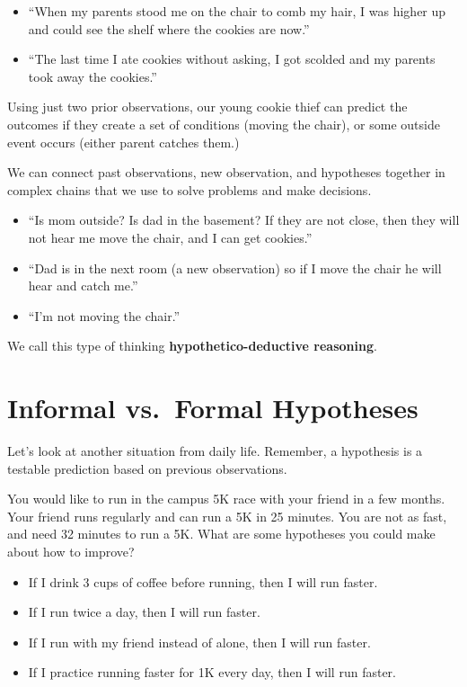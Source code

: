\documentclass[
]{book}
\providecommand{\tightlist}{%
  \setlength{\itemsep}{0pt}\setlength{\parskip}{0pt}}
\begin{document}
\begin{itemize}
\tightlist
\item
  ``When my parents stood me on the chair to comb my hair, I was higher up and could see the shelf where the cookies are now.''
\item
  ``The last time I ate cookies without asking, I got scolded and my parents took away the cookies.''
\end{itemize}

Using just two prior observations, our young cookie thief can predict the outcomes if they create a set of conditions (moving the chair), or some outside event occurs (either parent catches them.)

We can connect past observations, new observation, and hypotheses together in complex chains that we use to solve problems and make decisions.

\begin{itemize}
\tightlist
\item
  ``Is mom outside? Is dad in the basement? If they are not close, then they will not hear me move the chair, and I can get cookies.''
\item
  ``Dad is in the next room (a new observation) so if I move the chair he will hear and catch me.''
\item
  ``I'm not moving the chair.''
\end{itemize}

We call this type of thinking \textbf{hypothetico-deductive reasoning}.

\hypertarget{informal-vs.-formal-hypotheses}{%
\section{Informal vs.~Formal Hypotheses}\label{informal-vs.-formal-hypotheses}}

Let's look at another situation from daily life. Remember, a hypothesis is a testable prediction based on previous observations.

You would like to run in the campus 5K race with your friend in a few months. Your friend runs regularly and can run a 5K in 25 minutes. You are not as fast, and need 32 minutes to run a 5K. What are some hypotheses you could make about how to improve?

\begin{itemize}
\tightlist
\item
  If I drink 3 cups of coffee before running, then I will run faster.
\item
  If I run twice a day, then I will run faster.
\item
  If I run with my friend instead of alone, then I will run faster.
\item
  If I practice running faster for 1K every day, then I will run faster.
\end{itemize}
\end{document}
